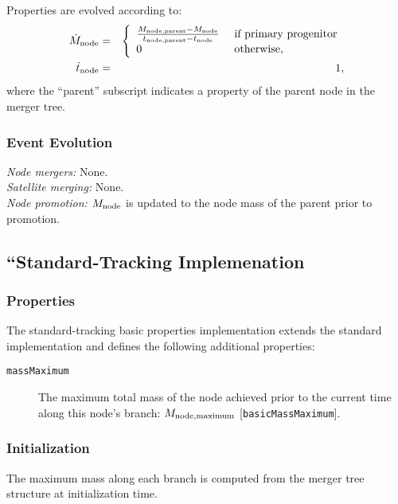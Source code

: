 Properties are evolved according to:
\begin{eqnarray}
 \dot{M}_{\rm node} &=& \left\{\begin{array}{ll}{M_{\rm node, parent} - M_{\rm node} \over t_{\rm node, parent} - t_{\rm node}} & \hbox{ if primary progenitor} \\ 0 & \hbox{ otherwise}, \end{array} \right. \\
 \dot{t}_{\rm node} &=& 1,
\end{eqnarray}
where the ``parent'' subscript indicates a property of the parent \gls{node} in the merger tree.

\subsubsection{Event Evolution}

\noindent\emph{Node mergers:} None.\\

\noindent\emph{Satellite merging:} None.\\

\noindent\emph{Node promotion:} $M_{\rm node}$ is updated to the \gls{node} mass of the parent prior to promotion.\\

\subsection{``Standard-Tracking Implemenation}

\subsubsection{Properties}

The standard-tracking basic properties implementation extends the standard implementation and defines the following additional properties:
\begin{description}
 \item [{\tt massMaximum}] The maximum total mass of the node achieved prior to the current time along this node's branch: $M_{\rm node, maximum}$ [{\tt basicMassMaximum}].
\end{description}

\subsubsection{Initialization}

The maximum mass along each branch is computed from the merger tree structure at initialization time.


